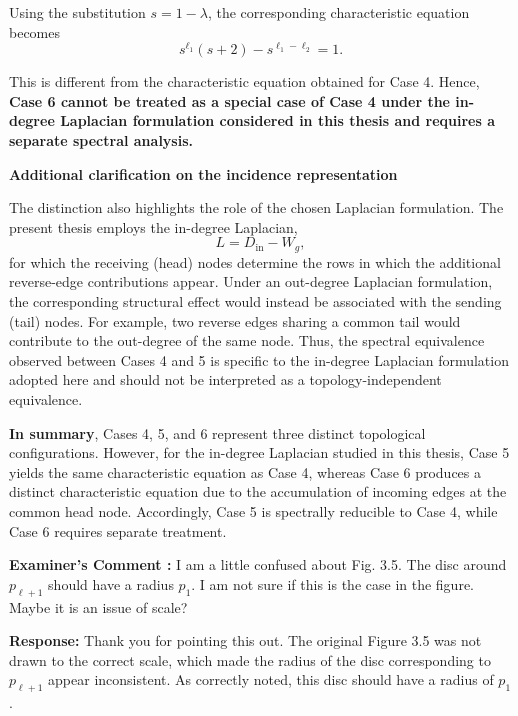 \documentclass[11pt,a4paper]{article}
\newcounter{examcomment}
\renewcommand{\theexamcomment}{\arabic{examcomment}}
\newcommand{\comment}[1]{%
	\refstepcounter{examcomment}%
	\par\vspace{5pt}\noindent
	\colorbox{gray!13}{%
		\parbox{\dimexpr\linewidth-2\fboxsep}{%
			\textbf{Examiner's Comment \theexamcomment:} #1%
		}%
	}%
	\par
}
\newcommand{\response}{\par\textbf{Response:} }
\begin{document}
Using the substitution $s=1-\lambda$, the corresponding characteristic equation becomes
\begin{equation}
    s^{\ell_1}(s+2)-s^{\ell_1-\ell_2}=1.
    \tag{2.61}
\end{equation}

This is different from the characteristic equation obtained for Case 4. Hence, \textbf{Case 6 cannot be treated as a special case of Case 4 under the in-degree Laplacian formulation considered in this thesis and requires a separate spectral analysis.}

\medskip
\noindent
\textbf{Additional clarification on the incidence representation}

The distinction also highlights the role of the chosen Laplacian formulation. The present thesis employs the in-degree Laplacian,
\begin{equation}
    L=D_{\mathrm{in}}-W_g,
\end{equation}
for which the receiving (head) nodes determine the rows in which the additional reverse-edge contributions appear. Under an out-degree Laplacian formulation, the corresponding structural effect would instead be associated with the sending (tail) nodes. For example, two reverse edges sharing a common tail would contribute to the out-degree of the same node. Thus, the spectral equivalence observed between Cases 4 and 5 is specific to the in-degree Laplacian formulation adopted here and should not be interpreted as a topology-independent equivalence.

\medskip
\noindent
\textbf{In summary}, Cases 4, 5, and 6 represent three distinct topological configurations. However, for the in-degree Laplacian studied in this thesis, Case 5 yields the same characteristic equation as Case 4, whereas Case 6 produces a distinct characteristic equation due to the accumulation of incoming edges at the common head node. Accordingly, Case 5 is spectrally reducible to Case 4, while Case 6 requires separate treatment.

\comment{I am a little confused about Fig. 3.5. The disc around $p_{\ell+1}$ should have a radius $p_1$. I am not sure if this is the case in the figure. Maybe it is an issue of scale?}
\response
Thank you for pointing this out. The original Figure 3.5 was not drawn to the correct scale, which made the radius of the disc corresponding to $p_{\ell+1}$ appear inconsistent. As correctly noted, this disc should have a radius of $p_1$. 
\end{document}
